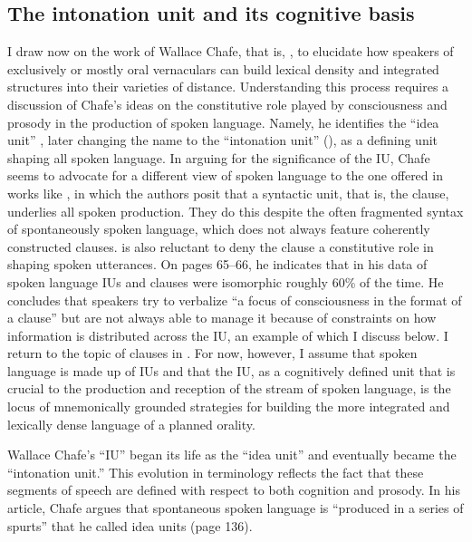 \subsection{The intonation unit and its cognitive basis}\label{sec:6.1.1}

I draw now on the work of Wallace Chafe, that is, \citet{Chafe1980, Chafe1981, Chafe1987, Chafe1994}, to elucidate how speakers of exclusively or mostly oral vernaculars can build lexical density and integrated structures into their varieties of distance. Understanding this process requires a discussion of Chafe’s ideas on the constitutive role played by consciousness and prosody in the production of spoken language. Namely, he identifies the “idea unit” \parencite{Chafe1980, Chafe1981}, later changing the name to the “intonation unit” (\citeyear{Chafe1994}), as a defining unit shaping all spoken language. In arguing for the significance of the IU, Chafe seems to advocate for a different view of spoken language to the one offered in works like \citet{MillerWeinert1998}, in which the authors posit that a syntactic unit, that is, the clause, underlies all spoken production. They do this despite the often fragmented syntax of spontaneously spoken language, which does not always feature coherently constructed clauses. \citet{Chafe1994} is also reluctant to deny the clause a constitutive role in shaping spoken utterances. On pages 65--66, he indicates that in his data of spoken language IUs and clauses were isomorphic roughly 60\% of the time. He concludes that speakers try to verbalize “a focus of consciousness in the format of a clause” but are not always able to manage it because of constraints on how information is distributed across the IU, an example of which I discuss below. I return to the topic of clauses in . For now, however, I assume that spoken language is made up of IUs and that the IU, as a cognitively defined unit that is crucial to the production and reception of the stream of spoken language, is the locus of mnemonically grounded strategies for building the more integrated and lexically dense language of a planned orality.

Wallace Chafe’s ``IU'' began its life as the “idea unit” and eventually became the “intonation unit.” This evolution in terminology reflects the fact that these segments of speech are defined with respect to both cognition and prosody. In his \citeyear{Chafe1981} article, Chafe argues that spontaneous spoken language is “produced in a series of spurts” that he called idea units (page 136).

